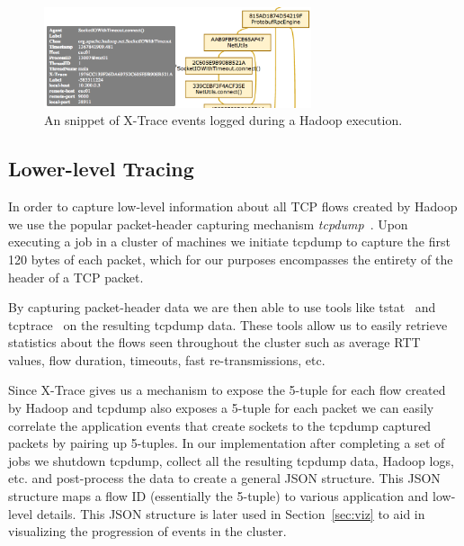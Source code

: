 \begin{figure}
\centering
\includegraphics[width=0.7\textwidth]{figures/xtrace-example2.png}
\caption{An snippet of X-Trace events logged during a Hadoop execution.}
\label{fig:xtrace}
\end{figure}

\subsection{Lower-level Tracing}
\label{ssec:low}
In order to capture low-level information about all TCP flows created by Hadoop 
we use the popular packet-header capturing mechanism \emph{tcpdump}~\cite{tcpdump}.
Upon executing a job in a cluster of machines we initiate tcpdump to capture the 
first 120 bytes of each packet, which for our purposes encompasses the entirety of 
the header of a TCP packet. 

By capturing packet-header data we are then able to use tools like tstat~\cite{tstat}
and tcptrace~\cite{tcptrace} on the resulting tcpdump data. These tools allow us to 
easily retrieve statistics about the flows seen throughout the cluster such as 
average RTT values, flow duration, timeouts, fast re-transmissions, etc. 

Since X-Trace gives us a mechanism to expose the 5-tuple for each flow created by 
Hadoop and tcpdump also exposes a 5-tuple for each packet we can easily correlate
the application events that create sockets to the tcpdump captured packets by 
pairing up 5-tuples. In our implementation after completing a set of jobs we 
shutdown tcpdump, collect all the resulting tcpdump data, Hadoop logs, etc. and 
post-process the data to create a general JSON structure. This JSON structure maps
a flow ID (essentially the 5-tuple) to various application and low-level details. 
This JSON structure is later used in Section~\ref{sec:viz} to aid in visualizing the 
progression of events in the cluster.

